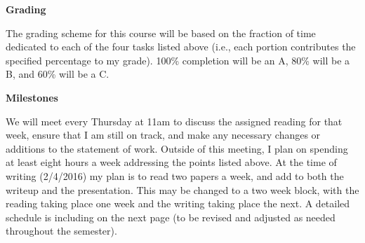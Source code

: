 \documentclass[12pt]{article}
\begin{document}
\large\textbf{Grading}\normalsize

The grading scheme for this course will be based on the fraction of
time dedicated to each of the four tasks listed above (i.e., each
portion contributes the specified percentage to my grade).
100\% completion will be an A, 80\% will be a B, and 60\% will be a C.


\large\textbf{Milestones}\normalsize

We will meet every Thursday at 11am to discuss the assigned reading
for that week, ensure that I am still on track, and make any necessary
changes or additions to the statement of work.
Outside of this meeting, I plan on spending at least eight
hours a week addressing the points listed above.
At the time of writing (2/4/2016) my plan is to read two papers a
week, and add to both the writeup and the presentation. This may be
changed to a two week block, with the reading taking place one week
and the writing taking place the next.
A detailed schedule is including on the next page (to be revised and
adjusted as
needed throughout the semester).

\newpage
\end{document}
